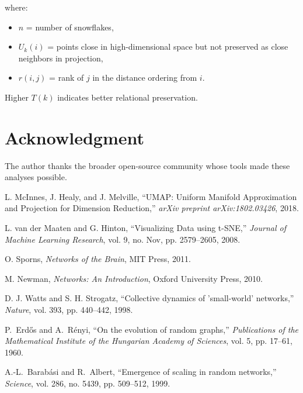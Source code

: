\documentclass[conference]{IEEEtran}
\begin{document}
where:
\begin{itemize}
    \item $n$ = number of snowflakes,
    \item $U_k(i)$ = points close in high-dimensional space but not preserved as close neighbors in projection,
    \item $r(i,j)$ = rank of $j$ in the distance ordering from $i$.
\end{itemize}

Higher $T(k)$ indicates better relational preservation.

\section*{Acknowledgment}
The author thanks the broader open-source community whose tools made these analyses possible.

\begin{thebibliography}{99}

L. McInnes, J. Healy, and J. Melville, ``UMAP: Uniform Manifold Approximation and Projection for Dimension Reduction,'' \textit{arXiv preprint arXiv:1802.03426}, 2018.

L. van der Maaten and G. Hinton, ``Visualizing Data using t-SNE,'' \textit{Journal of Machine Learning Research}, vol. 9, no. Nov, pp. 2579--2605, 2008.

O. Sporns, \textit{Networks of the Brain}, MIT Press, 2011.

M. Newman, \textit{Networks: An Introduction}, Oxford University Press, 2010.

D. J. Watts and S. H. Strogatz, ``Collective dynamics of 'small-world' networks,'' \textit{Nature}, vol. 393, pp. 440--442, 1998.

P.~Erd\H{o}s and A.~R\'enyi, ``On the evolution of random graphs,'' \textit{Publications of the Mathematical Institute of the Hungarian Academy of Sciences}, vol. 5, pp. 17--61, 1960.

A.-L.~Barab\'asi and R.~Albert, ``Emergence of scaling in random networks,'' \textit{Science}, vol. 286, no. 5439, pp. 509--512, 1999.

\end{thebibliography}
\end{document}
